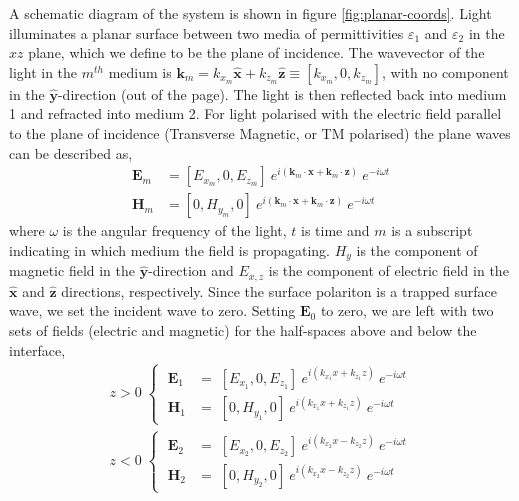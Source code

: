 A schematic diagram of the system is shown in figure \ref{fig:planar-coords}. Light illuminates a planar surface between two media of permittivities $\varepsilon_1$ and $\varepsilon_2$ in the $xz$ plane, which we define to be the plane of incidence. The wavevector of the light in the $m^{th}$ medium is $\mathbf{k}_m = k_{x_m}\mathbf{\hat{x}}+k_{z_m}\mathbf{\hat{z}} \equiv [k_{x_m},0,k_{z_m}]$, with no component in the $\mathbf{\hat{y}}$-direction (out of the page). The light is then reflected back into medium 1 and refracted into medium 2.  For light polarised with the electric field parallel to the plane of incidence (Transverse Magnetic, or TM polarised) the plane waves can be described as,
\begin{align*}
\mathbf{E}_m&=[E_{x_m},0,E_{z_m}]\:e^{i(\mathbf{k}_m\cdot \mathbf{x}+\mathbf{k}_m\cdot\mathbf{z})}\:e^{-i\omega t}\\
\mathbf{H}_m&=[0,H_{y_m},0]\:e^{i(\mathbf{k}_m\cdot \mathbf{x}+\mathbf{k}_m\cdot\mathbf{z})}\:e^{-i\omega t}
\end{align*}
where $\omega$ is the angular frequency of the light, $t$ is time and $m$ is a subscript indicating in which medium the field is propagating. $H_{y}$ is the component of magnetic field in the $\mathbf{\hat{y}}$-direction and $E_{x,z}$ is the component of electric field in the $\mathbf{\hat{x}}$ and  $\mathbf{\hat{z}}$ directions, respectively. 
Since the surface polariton is a trapped surface wave, we set the incident wave to zero. Setting $\mathbf{E}_0$ to zero, we are left with two sets of fields (electric and magnetic) for the half-spaces above and below the interface,
\begin{align}
z>0\;\begin{cases}\;\mathbf{E}_1&=\;[E_{x_1},0,E_{z_1}]\:e^{i(k_{x_1}x+k_{z_1}z)}\:e^{-i\omega t}\\
\;\mathbf{H}_1&=\;[0,H_{y_1},0]\:e^{i(k_{x_1}x+k_{z_1}z)}\:e^{-i\omega t}
\end{cases}\label{eq:planewaveset1}\\
z<0\;\begin{cases}\;\mathbf{E}_2&=\;[E_{x_2},0,E_{z_2}]\:e^{i(k_{x_2}x-k_{z_2}z)}\:e^{-i\omega t}\\
\;\mathbf{H}_2&=\;[0,H_{y_2},0]\:e^{i(k_{x_2}x-k_{z_2}z)}\:e^{-i\omega t}
\end{cases}\label{eq:planewaveset2}
\end{align}
